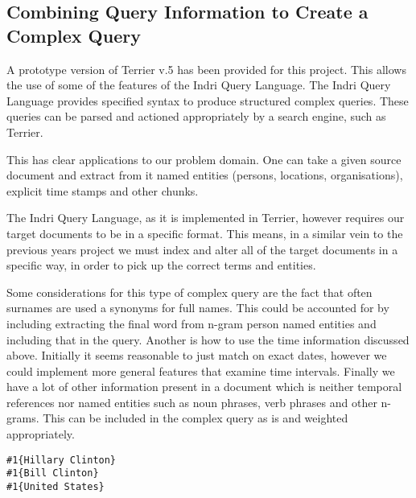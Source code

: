 \documentclass{mprop}
\newenvironment{codelisting}{\captionsetup{type=listing}}{}
\begin{document}
\subsection{Combining Query Information to Create a Complex Query}
\label{proposedapproach.complexquery}
A prototype version of Terrier v.5 has been provided for this project. This allows the use of some of the features of the Indri Query Language. The Indri Query Language provides specified syntax to produce structured complex queries. These queries can be parsed and actioned appropriately by a search engine, such as Terrier.

This has clear applications to our problem domain. One can take a given source document and extract from it named entities (persons, locations, organisations), explicit time stamps and other chunks.

The Indri Query Language, as it is implemented in Terrier, however requires our target documents to be in a specific format.  This means, in a similar vein to the previous years project we must index and alter all of the target documents in a specific way, in order to pick up the correct terms and entities.

Some considerations for this type of complex query are the fact that often surnames are used a synonyms for full names. This could be accounted for by including extracting the final word from n-gram person named entities and including that in the query. Another is how to use the time information discussed above. Initially it seems reasonable to just match on exact dates, however we could implement more general features that examine time intervals. Finally we have a lot of other information present in a document which is neither temporal references nor named entities such as noun phrases, verb phrases and other n-grams. This can be included in the complex query as is and weighted appropriately.

\begin{codelisting}
\begin{verbatim}
#1{Hillary Clinton}
#1{Bill Clinton}
#1{United States}
\end{verbatim}
\label{code:indrisample}
\end{codelisting}
\end{document}
